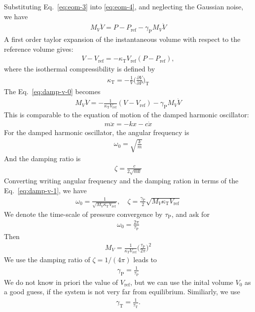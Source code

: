 \documentclass[aps, pre, preprint,unsortedaddress,a4paper,onecolumn]{revtex4}
\newcommand{\target}{\textrm{ref}}
\newcommand{\temp}[0]{{\textrm{T}}}
\newcommand{\pres}[0]{{\textrm{P}}}
\begin{document}
Substituting Eq.~\eqref{eq:eom-3} into \eqref{eq:eom-4}, and neglecting the
Gaussian noise, we have
\begin{align}\label{eq:damp-v-0}
  M_V \ddot V = P - P_\target - \gamma_\pres M_V \dot V 
\end{align}
A first order taylor expansion of the instantaneous volume with respect to the
reference volume gives:
\begin{align}
  V - V_\target = -\kappa_\temp V_\target (P - P_\target),
\end{align}
where the isothermal compressibility is defined by
\begin{align}
  \kappa_\temp =-\frac 1V \Big(\frac{\partial V}{\partial P}\Big)_\temp
\end{align}
The Eq.~\eqref{eq:damp-v-0} becomes
\begin{align}\label{eq:damp-v-1}
  M_V \ddot V = -\frac{1}{\kappa_\temp V_\target}(V - V_\target) - \gamma_\pres M_V \dot V
\end{align}
This is comparable to the equation of motion of the damped harmonic oscillator:
\begin{align}
  m\ddot x = -kx - c\dot x
\end{align}
For the damped harmonic oscillator, the angular frequency is
\begin{align}
  \omega_0 = \sqrt{\frac km}
\end{align}
And the damping ratio is
\begin{align}
  \zeta = \frac{c}{2\sqrt{mk}}
\end{align}
Converting writing angular frequency and the damping ration in terms of the
Eq.~\eqref{eq:damp-v-1}, we have
\begin{align}
  \omega_0 = \frac{1}{\sqrt{M_V \kappa_\temp V_\target}}, \quad
  \zeta = \frac{\gamma_\pres}{2}\sqrt{M_V\kappa_\temp V_\target}
\end{align}
We denote the time-scale of pressure convergence by $\tau_\pres$, and ask for
\begin{align}
  \omega_0 = \frac{2\pi}{\tau_\pres}
\end{align}
Then
\begin{align}
  M_V = \frac{1}{\kappa_T V_\target}\Big(\frac{\tau_\pres}{2\pi}\Big)^2
\end{align}
We use the damping ratio of $\zeta = 1/(4\pi)$ leads to
\begin{align}
  \gamma_\pres = \frac{1}{\tau_\pres}
\end{align}
We do not know in priori the value of $V_\target$, but we can use the
inital volume $V_0$ as a good guess, if the system is not very far from
equilibrium.
Similiarly, we use 
\begin{align}
  \gamma_\temp = \frac{1}{\tau_\temp}.
\end{align}
\end{document}
